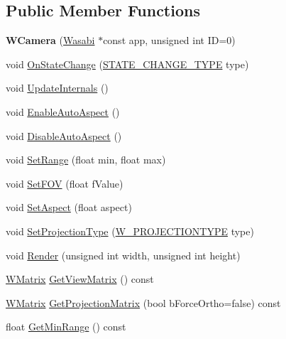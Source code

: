 \subsection*{Public Member Functions}
\begin{DoxyCompactItemize}
\item 
{\bfseries W\+Camera} (\hyperlink{class_wasabi}{Wasabi} $\ast$const app, unsigned int ID=0)\hypertarget{class_w_camera_a02362e02ece2c149e2abd1f7358f88e7}{}\label{class_w_camera_a02362e02ece2c149e2abd1f7358f88e7}

\item 
void \hyperlink{class_w_camera_a44cd30d5dc870c8a08c200ccca64792f}{On\+State\+Change} (\hyperlink{_w_orientation_8h_afe94de0a48bbd7b343ab18bc318cef28}{S\+T\+A\+T\+E\+\_\+\+C\+H\+A\+N\+G\+E\+\_\+\+T\+Y\+PE} type)
\item 
void \hyperlink{class_w_camera_af59a47532adac71379efd499ec655750}{Update\+Internals} ()
\item 
void \hyperlink{class_w_camera_aa4c4abcba7618888e33984f4220dab03}{Enable\+Auto\+Aspect} ()
\item 
void \hyperlink{class_w_camera_ac8b3661f197c10cf0ffb5dae4ff550ca}{Disable\+Auto\+Aspect} ()
\item 
void \hyperlink{class_w_camera_a18ebb7d402821e7e1e75f807845c842c}{Set\+Range} (float min, float max)
\item 
void \hyperlink{class_w_camera_a846ac55abaf3f25e2dbe1af3aff4ab91}{Set\+F\+OV} (float f\+Value)
\item 
void \hyperlink{class_w_camera_a52ad98e1106f1cc235fca2f303f95cce}{Set\+Aspect} (float aspect)
\item 
void \hyperlink{class_w_camera_a960555526c2bfcd06fc06ba7ac5c5f13}{Set\+Projection\+Type} (\hyperlink{_w_camera_8h_a9a7f9c92f81a74e22c4e4c6f08cd6dde}{W\+\_\+\+P\+R\+O\+J\+E\+C\+T\+I\+O\+N\+T\+Y\+PE} type)
\item 
void \hyperlink{class_w_camera_a90b2aa2474068643e88876ac50639e0e}{Render} (unsigned int width, unsigned int height)
\item 
\hyperlink{class_w_matrix}{W\+Matrix} \hyperlink{class_w_camera_a5a1c340a7bfd239fe3675f27afacfb48}{Get\+View\+Matrix} () const 
\item 
\hyperlink{class_w_matrix}{W\+Matrix} \hyperlink{class_w_camera_a8a579493db789bbc7d2a7c295d161279}{Get\+Projection\+Matrix} (bool b\+Force\+Ortho=false) const 
\item 
float \hyperlink{class_w_camera_af50819dad55bf98e54f3cd046a39d1f8}{Get\+Min\+Range} () const 

\end{DoxyCompactItemize}
